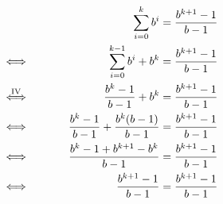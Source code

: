 \documentclass{article}
\begin{document}
    \begin{alignat*}{2}
        &&\hspace*{5ex}\sum_{i = 0}^{k}b^i &= \frac{b^{k + 1} - 1}{b - 1}\\
        \Longleftrightarrow&& \hspace*{15ex}\sum_{i = 0}^{k - 1}b^i + b^k &= \frac{b^{k + 1} - 1}{b - 1}\\
        \stackrel{\text{IV}}{\Longleftrightarrow}&& \frac{b^k - 1}{b - 1} + b^k &= \frac{b^{k + 1} - 1}{b - 1}\\
        \Longleftrightarrow&& \frac{b^k - 1}{b - 1} + \frac{b^k (b - 1)}{b - 1} &= \frac{b^{k + 1} - 1}{b - 1}\\
        \Longleftrightarrow&& \frac{b^k - 1 + b^{k+1} - b^k}{b - 1} &= \frac{b^{k + 1} - 1}{b - 1}\\
        \Longleftrightarrow&& \frac{b^{k+1} - 1}{b - 1} &= \frac{b^{k+1} - 1}{b - 1}
    \end{alignat*}
\end{document}
